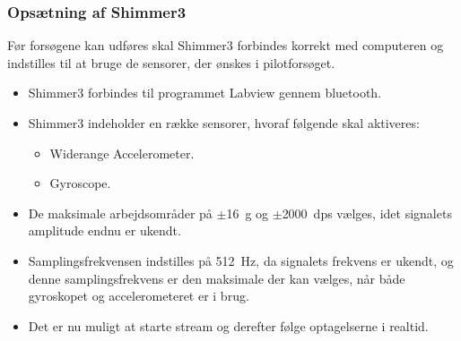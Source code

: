 \subsubsection{Opsætning af Shimmer3}
Før forsøgene kan udføres skal Shimmer3 forbindes korrekt med computeren og indstilles til at bruge de sensorer, der ønskes i pilotforsøget. \vspace{-3mm}
\begin{itemize}
	\item Shimmer3 forbindes til programmet Labview gennem bluetooth.
	\item Shimmer3 indeholder en række sensorer, hvoraf følgende skal aktiveres: 
	\begin{itemize}\vspace{-.15cm}
		\item Widerange Accelerometer.
		\item Gyroscope.
	\end{itemize}
	\item De maksimale arbejdsområder på $\pm$16~g og $\pm$2000~dps vælges, idet signalets amplitude endnu er ukendt.
	\item Samplingsfrekvensen indstilles på 512~Hz, da signalets frekvens er ukendt, og denne samplingsfrekvens er den maksimale der kan vælges, når både gyroskopet og accelerometeret er i brug.  
	\item Det er nu muligt at starte stream og derefter følge optagelserne i realtid.
\end{itemize}

